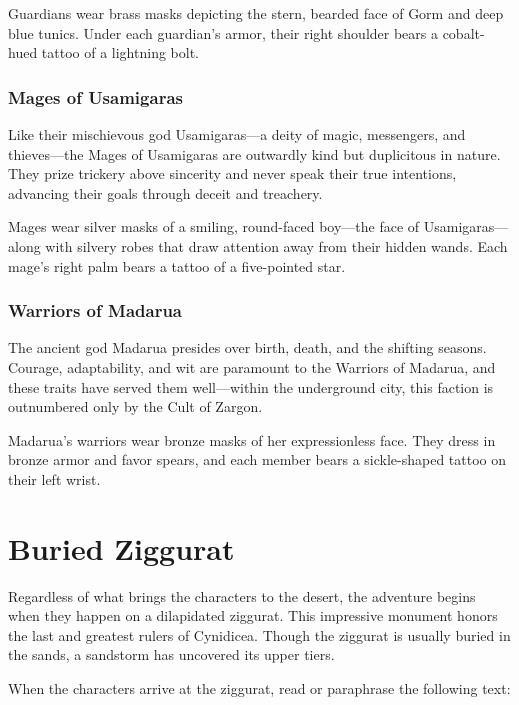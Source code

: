 \documentclass[10pt,a4paper,twoside,bg=print,twocolumn,openany,nodeprecatedcode]{dndbook}
\begin{document}
Guardians wear brass masks depicting the stern, bearded face of Gorm and deep blue tunics. Under each guardian's armor, their right shoulder bears a cobalt-hued tattoo of a lightning bolt.

\subsubsection{Mages of Usamigaras}
Like their mischievous god Usamigaras—a deity of magic, messengers, and thieves—the Mages of Usamigaras are outwardly kind but duplicitous in nature. They prize trickery above sincerity and never speak their true intentions, advancing their goals through deceit and treachery.

Mages wear silver masks of a smiling, round-faced boy—the face of Usamigaras—along with silvery robes that draw attention away from their hidden wands. Each mage's right palm bears a tattoo of a five-pointed star.

\subsubsection{Warriors of Madarua}
The ancient god Madarua presides over birth, death, and the shifting seasons. Courage, adaptability, and wit are paramount to the Warriors of Madarua, and these traits have served them well—within the underground city, this faction is outnumbered only by the Cult of Zargon.

Madarua's warriors wear bronze masks of her expressionless face. They dress in bronze armor and favor spears, and each member bears a sickle-shaped tattoo on their left wrist.

\section{Buried Ziggurat}
Regardless of what brings the characters to the desert, the adventure begins when they happen on a dilapidated ziggurat. This impressive monument honors the last and greatest rulers of Cynidicea. Though the ziggurat is usually buried in the sands, a sandstorm has uncovered its upper tiers.

When the characters arrive at the ziggurat, read or paraphrase the following text:
\end{document}
